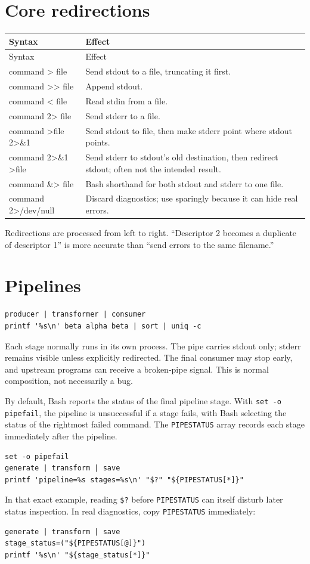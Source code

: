 \documentclass[11pt,oneside,openany]{book}
\begin{document}
\section{Core redirections}
\begin{longtable}{>{\ttfamily}p{}p{}}
\toprule
Syntax & Effect \\
\midrule
\endfirsthead\toprule Syntax & Effect \\
\midrule\endhead
command > file & Send stdout to a file, truncating it first. \\
command >> file & Append stdout. \\
command < file & Read stdin from a file. \\
command 2> file & Send stderr to a file. \\
command >file 2>\&1 & Send stdout to file, then make stderr point where stdout points. \\
command 2>\&1 >file & Send stderr to stdout's old destination, then redirect stdout; often not the intended result. \\
command \&> file & Bash shorthand for both stdout and stderr to one file. \\
command 2>/dev/null & Discard diagnostics; use sparingly because it can hide real errors. \\
\bottomrule
\end{longtable}

Redirections are processed from left to right. “Descriptor 2 becomes a duplicate of descriptor 1” is more accurate than “send errors to the same filename.”

\section{Pipelines}
\begin{lstlisting}
producer | transformer | consumer
printf '%s\n' beta alpha beta | sort | uniq -c
\end{lstlisting}
Each stage normally runs in its own process. The pipe carries stdout only; stderr remains visible unless explicitly redirected. The final consumer may stop early, and upstream programs can receive a broken-pipe signal. This is normal composition, not necessarily a bug.

By default, Bash reports the status of the final pipeline stage. With \texttt{set -o pipefail}, the pipeline is unsuccessful if a stage fails, with Bash selecting the status of the rightmost failed command. The \texttt{PIPESTATUS} array records each stage immediately after the pipeline.
\begin{lstlisting}
set -o pipefail
generate | transform | save
printf 'pipeline=%s stages=%s\n' "$?" "${PIPESTATUS[*]}"
\end{lstlisting}
In that exact example, reading \texttt{\$?} before \texttt{PIPESTATUS} can itself disturb later status inspection. In real diagnostics, copy \texttt{PIPESTATUS} immediately:
\begin{lstlisting}
generate | transform | save
stage_status=("${PIPESTATUS[@]}")
printf '%s\n' "${stage_status[*]}"
\end{lstlisting}
\end{document}
